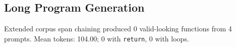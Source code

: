 \subsection{Long Program Generation}
Extended corpus span chaining produced 0 valid-looking functions from 4 prompts.
Mean tokens: 104.00; 0 with \texttt{return}, 0 with loops.
